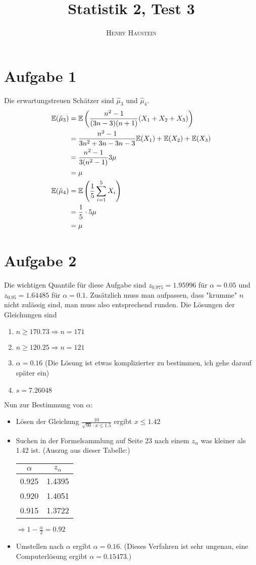 \documentclass{article}
\title{\textbf{Statistik 2, Test 3}}
\author{\textsc{Henry Haustein}}
\date{}
\newcommand{\E}{\mathbb{E}}
\begin{document}
	\maketitle
	
	\section*{Aufgabe 1}
	Die erwartungstreuen Schätzer sind $\hat{\mu}_3$ und $\hat{\mu}_4$.
	\begin{align}
		\E(\hat{\mu}_3) &= \E\left(\frac{n^2-1}{(3n-3)(n+1)}(X_1+X_2+X_3)\right) \notag \\
		&= \frac{n^2-1}{3n^2+3n-3n-3}\E(X_1) + \E(X_2) + \E(X_3) \notag \\
		&= \frac{n^2-1}{3(n^2-1)}3\mu \notag \\
		&= \mu \notag \\
		\E(\hat{\mu}_4) &= \E\left( \frac{1}{5}\sum_{i=1}^{5} X_i\right) \notag \\
		&= \frac{1}{5}\cdot 5\mu \notag \\
		&= \mu \notag
	\end{align}

	\section*{Aufgabe 2}
	Die wichtigen Quantile für diese Aufgabe sind $z_{0.975}=1.95996$ für $\alpha=0.05$ und $z_{0.95}=1.64485$ für $\alpha=0.1$. Zusätzlich muss man aufpassen, dass "krumme" $n$ nicht zulässig sind, man muss also entsprechend runden. Die Lösungen der Gleichungen sind
	\begin{enumerate}[label=(\alph*)]
		\item $n \ge 170.73 \Rightarrow n = 171$
		\item $n \ge 120.25 \Rightarrow n = 121$
		\item $\alpha=0.16$ (Die Lösung ist etwas komplizierter zu bestimmen, ich gehe darauf später ein)
		\item $s=7.26048$
	\end{enumerate}
	Nun zur Bestimmung von $\alpha$:
	\begin{itemize}
		\item Lösen der Gleichung $\frac{10}{\sqrt{90}\cdot x \le 1.5}$ ergibt $x \le 1.42$
		\item Suchen in der Formelsammlung auf Seite 23 nach einem $z_\alpha$ was kleiner als 1.42 ist. (Auszug aus dieser Tabelle:)
		\begin{center}
			\begin{tabular}{c|c}
				$\alpha$ & $z_{\alpha}$ \\
				\hline
				0.925 & 1.4395 \\
				0.920 & 1.4051 \\
				0.915 & 1.3722
			\end{tabular}
		\end{center}
		$\Rightarrow 1-\frac{\alpha}{2}=0.92$
		\item Umstellen nach $\alpha$ ergibt $\alpha=0.16$. (Dieses Verfahren ist sehr ungenau, eine Computerlösung ergibt $\alpha=0.15473$.)
	\end{itemize}
\end{document}
